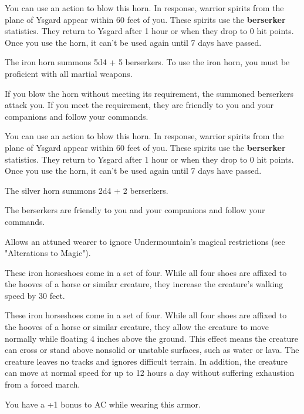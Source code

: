 \documentclass[10pt,a4paper,twoside,bg=print,twocolumn,openany,nodeprecatedcode]{dndbook}
\begin{document}
You can use an action to blow this horn. In response, warrior spirits from the plane of Ysgard appear within 60 feet of you. These spirits use the \textbf{berserker} statistics. They return to Ysgard after 1 hour or when they drop to 0 hit points. Once you use the horn, it can't be used again until 7 days have passed.

The iron horn summons 5d4 + 5 berserkers. To use the iron horn, you must be proficient with all martial weapons.

If you blow the horn without meeting its requirement, the summoned berserkers attack you. If you meet the requirement, they are friendly to you and your companions and follow your commands.

You can use an action to blow this horn. In response, warrior spirits from the plane of Ysgard appear within 60 feet of you. These spirits use the \textbf{berserker} statistics. They return to Ysgard after 1 hour or when they drop to 0 hit points. Once you use the horn, it can't be used again until 7 days have passed.

The silver horn summons 2d4 + 2 berserkers.

The berserkers are friendly to you and your companions and follow your commands.

Allows an attuned wearer to ignore Undermountain's magical restrictions (see "Alterations to Magic").

These iron horseshoes come in a set of four. While all four shoes are affixed to the hooves of a horse or similar creature, they increase the creature's walking speed by 30 feet.

These iron horseshoes come in a set of four. While all four shoes are affixed to the hooves of a horse or similar creature, they allow the creature to move normally while floating 4 inches above the ground. This effect means the creature can cross or stand above nonsolid or unstable surfaces, such as water or lava. The creature leaves no tracks and ignores difficult terrain. In addition, the creature can move at normal speed for up to 12 hours a day without suffering exhaustion from a forced march.

You have a +1 bonus to AC while wearing this armor.
\end{document}
